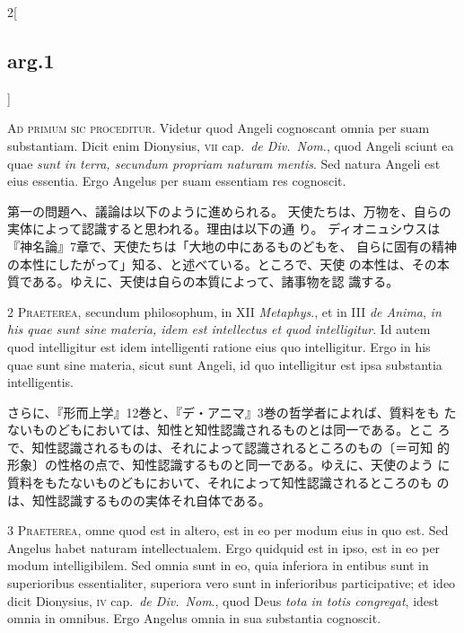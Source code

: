 \documentclass[paper=a4paper,fontsize=10pt,jafontsize=9pt,titlepage]{jlreq}
\begin{document}
\begin{paracol}{2}[\subsection{arg.1}]

{\huge A}{\scshape d primum sic proceditur}. Videtur quod Angeli
cognoscant omnia per suam substantiam. Dicit enim Dionysius, {\scshape
 vii} cap.~{\itshape de Div.~Nom.}, quod Angeli sciunt ea quae {\itshape sunt in terra, secundum propriam
naturam mentis}. Sed natura Angeli est eius essentia. Ergo Angelus per
suam essentiam res cognoscit.

\switchcolumn

第一の問題へ、議論は以下のように進められる。
天使たちは、万物を、自らの実体によって認識すると思われる。理由は以下の通
 り。
ディオニュシウスは『神名論』7章で、天使たちは「大地の中にあるものどもを、
 自らに固有の精神の本性にしたがって」知る、と述べている。ところで、天使
 の本性は、その本質である。ゆえに、天使は自らの本質によって、諸事物を認
 識する。


{\scshape 2 Praeterea}, secundum philosophum, in XII {\itshape Metaphys}., et in
III {\itshape de Anima}, {\itshape in his quae sunt sine materia, idem est intellectus et
quod intelligitur}. Id autem quod intelligitur est idem intelligenti
ratione eius quo intelligitur. Ergo in his quae sunt sine materia, sicut
sunt Angeli, id quo intelligitur est ipsa substantia intelligentis.

\switchcolumn

さらに、『形而上学』12巻と、『デ・アニマ』3巻の哲学者によれば、質料をも
 たないものどもにおいては、知性と知性認識されるものとは同一である。とこ
 ろで、知性認識されるものは、それによって認識されるところのもの〔＝可知
 的形象〕の性格の点で、知性認識するものと同一である。ゆえに、天使のよう
 に質料をもたないものどもにおいて、それによって知性認識されるところのも
 のは、知性認識するものの実体それ自体である。


{\scshape 3 Praeterea}, omne quod est in altero, est in eo per modum
eius in quo est. Sed Angelus habet naturam intellectualem. Ergo quidquid
est in ipso, est in eo per modum intelligibilem. Sed omnia sunt in eo,
quia inferiora in entibus sunt in superioribus essentialiter, superiora
vero sunt in inferioribus participative; et ideo dicit Dionysius, {\scshape iv}
cap.~{\itshape de Div.~Nom}., quod Deus {\itshape tota in totis congregat}, idest omnia in
omnibus. Ergo Angelus omnia in sua substantia cognoscit.


\end{paracol}
\end{document}

